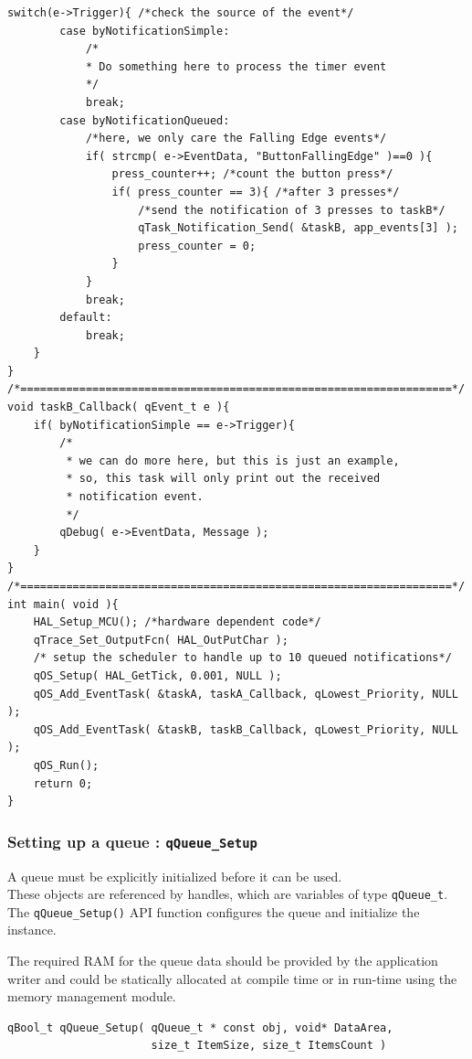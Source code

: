 \documentclass{article}
\begin{document}
\begin{lstlisting}[style=CStyle]
    switch(e->Trigger){ /*check the source of the event*/
        case byNotificationSimple: 
            /*
            * Do something here to process the timer event
            */
            break;
        case byNotificationQueued:
            /*here, we only care the Falling Edge events*/
            if( strcmp( e->EventData, "ButtonFallingEdge" )==0 ){
                press_counter++; /*count the button press*/
                if( press_counter == 3){ /*after 3 presses*/
                    /*send the notification of 3 presses to taskB*/
                    qTask_Notification_Send( &taskB, app_events[3] );
                    press_counter = 0;
                }
            }
            break;
        default:
            break;
    }
}
/*==================================================================*/
void taskB_Callback( qEvent_t e ){
    if( byNotificationSimple == e->Trigger){
        /*
         * we can do more here, but this is just an example,
         * so, this task will only print out the received 
         * notification event.
         */
        qDebug( e->EventData, Message );
    }
}
/*==================================================================*/
int main( void ){
    HAL_Setup_MCU(); /*hardware dependent code*/
    qTrace_Set_OutputFcn( HAL_OutPutChar );
    /* setup the scheduler to handle up to 10 queued notifications*/
    qOS_Setup( HAL_GetTick, 0.001, NULL ); 
    qOS_Add_EventTask( &taskA, taskA_Callback, qLowest_Priority, NULL );
    qOS_Add_EventTask( &taskB, taskB_Callback, qLowest_Priority, NULL );                     
    qOS_Run();
    return 0;
}
\end{lstlisting}

\subsubsection{Setting up a queue : \lstinline{qQueue_Setup} }  \label{queuecreate}
A queue must be explicitly initialized before it can be used. \\
These objects are referenced by handles, which are variables of type \lstinline{qQueue_t}. The \lstinline{qQueue_Setup()} API function configures the queue and initialize the instance. 

The required RAM for the queue data should be provided by the application writer and could be statically allocated at compile time or in run-time using the memory management module.\\
 
\begin{lstlisting}[style=CStyle]
qBool_t qQueue_Setup( qQueue_t * const obj, void* DataArea, 
                      size_t ItemSize, size_t ItemsCount )
\end{lstlisting}
\end{document}

